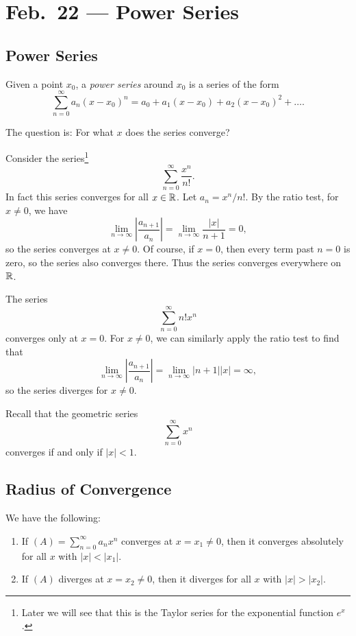 \chapter{Feb.~22 --- Power Series}

\section{Power Series}

\begin{definition}
  Given a point $x_0$, a \emph{power series} around
  $x_0$ is a series of the form
  \[
    \sum_{n=0}^\infty a_n (x - x_0)^n
    = a_0 + a_1(x - x_0) + a_2(x - x_0)^2 + \dots.
  \]
\end{definition}

\begin{remark}
  The question is: For what $x$ does the series converge?
\end{remark}

\begin{example}
  Consider the series\footnote{Later we will see that this is the Taylor series for the exponential function $e^x$.}
  \[
    \sum_{n = 0}^\infty \frac{x^n}{n!}.
  \]
  In fact this series converges for all $x \in \mathbb{R}$. Let
  $a_n = x^n / n!$. By
  the ratio test, for $x \ne 0$, we have
  \[
    \lim_{n \to \infty} \left|\frac{a_{n + 1}}{a_n}\right|
    = \lim_{n \to \infty} \frac{|x|}{n + 1} = 0,
  \]
  so the series converges at $x \ne 0$. Of course, if
  $x = 0$, then every term past $n = 0$ is zero, so the
  series also converges there. Thus the series
  converges everywhere on $\mathbb{R}$.
\end{example}

\begin{example}
  The series
  \[
    \sum_{n = 0}^\infty n! x^n
  \]
  converges only at $x = 0$. For $x \ne 0$, we
  can similarly apply the ratio test to find that
  \[
    \lim_{n \to \infty} \left|\frac{a_{n + 1}}{a_n}\right|
    = \lim_{n \to \infty} |n + 1| |x| = \infty,
  \]
  so the series diverges for $x \ne 0$.
\end{example}

\begin{example}
  Recall that the geometric series
  \[
    \sum_{n = 0}^\infty x^n
  \]
  converges if and only if $|x| < 1$.
\end{example}

\section{Radius of Convergence}
\begin{lemma}
  \label{lem:converge-at}
  We have the following:
  \begin{enumerate}
    \item If $(A) = \sum_{n = 0}^\infty a_n x^n$ converges
      at $x = x_1 \ne 0$, then it converges absolutely
      for all $x$ with $|x| < |x_1|$.
    \item If $(A)$ diverges at $x = x_2 \ne 0$, then it
      diverges for all $x$ with $|x| > |x_2|$.
  \end{enumerate}
\end{lemma}

